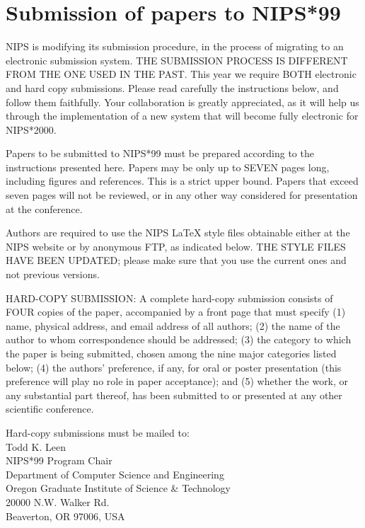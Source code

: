 \section{Submission of papers to NIPS*99} 
NIPS is modifying its submission procedure, in the
process of migrating to an electronic submission system. THE SUBMISSION PROCESS
IS DIFFERENT FROM THE ONE USED IN THE PAST. This year we require BOTH
electronic and hard copy submissions. Please read carefully the instructions
below, and follow them faithfully. Your collaboration is greatly appreciated,
as it will help us through the implementation of a new system that will become
fully electronic for NIPS*2000.

Papers to be submitted to NIPS*99 must be prepared according to the 
instructions presented here. Papers may be only up to SEVEN pages 
long, including figures and references. This is a strict upper 
bound. Papers that exceed seven pages will not be reviewed, or in any other 
way considered for presentation at the conference.

Authors are required to use the NIPS \LaTeX{} style files obtainable either 
at the NIPS website or by anonymous FTP, as indicated below. 
THE STYLE FILES HAVE BEEN UPDATED; please make sure that you use the 
current ones and not previous versions.

HARD-COPY SUBMISSION: A complete hard-copy submission consists 
of FOUR copies of the paper, 
accompanied by a front page that must specify (1) name, physical address, 
and email address of all authors; (2) the name of the author to whom 
correspondence should be addressed; (3) the category to which the paper 
is being submitted, chosen among the nine major categories listed below; 
(4) the authors' preference, if any, for oral or poster presentation 
(this preference will play no role in paper acceptance); and (5) whether 
the work, or any substantial part thereof, has been submitted
to or presented at any other scientific conference.

Hard-copy submissions must be mailed to: \\ 

Todd K. Leen  \\
NIPS*99 Program Chair \\
Department of Computer Science and Engineering \\
Oregon Graduate Institute of Science \& Technology \\
20000 N.W. Walker Rd. \\
Beaverton, OR 97006, USA \\

